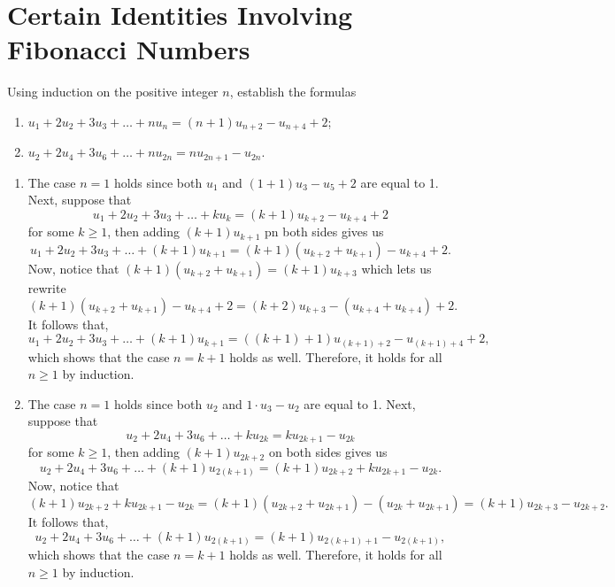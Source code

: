 \section{Certain Identities Involving Fibonacci Numbers}

\begin{exercise}
    Using induction on the positive integer $n$, establish the formulas
    \begin{enumerate}
        \item $u_1 + 2u_2 + 3u_3 + \dots + nu_n = (n+1)u_{n+2} - u_{n+4} + 2$;
        \item $u_2 + 2u_4 + 3u_6 + \dots + nu_{2n} = nu_{2n + 1} - u_{2n}$.\\
    \end{enumerate}
\end{exercise}

\begin{solution}
    \begin{enumerate}
        \item The case $n = 1$ holds since both $u_1$ and $(1+1)u_3 - u_5 + 2$ are equal to 1. Next, suppose that
        $$u_1 + 2u_2 + 3u_3 + \dots + ku_k = (k+1)u_{k+2} - u_{k+4} + 2$$
        for some $k \geq 1$, then adding $(k+1)u_{k+1}$ pn both sides gives us
        $$u_1 + 2u_2 + 3u_3 + \dots + (k+1)u_{k+1} = (k+1)(u_{k+2} + u_{k+1}) - u_{k+4} + 2.$$
        Now, notice that $(k+1)(u_{k+2} + u_{k+1}) = (k+1)u_{k+3}$ which lets us rewrite $$(k+1)(u_{k+2} + u_{k+1}) - u_{k+4} + 2 = (k+2)u_{k+3} - (u_{k+4} + u_{k+4}) + 2.$$
        It follows that,
        $$u_1 + 2u_2 + 3u_3 + \dots + (k+1)u_{k+1} = ((k+1) + 1)u_{(k+1)+2} - u_{(k+1) + 4} + 2,$$
        which shows that the case $n = k+1$ holds as well. Therefore, it holds for all $n \geq 1$ by induction.
        \item The case $n = 1$ holds since both $u_2$ and $1\cdot u_3 - u_2$ are equal to 1. Next, suppose that
        $$u_2 + 2u_4 + 3u_6 + \dots + ku_{2k} = ku_{2k + 1} - u_{2k}$$
        for some $k \geq 1$, then adding $(k+1)u_{2k+2}$ on both sides gives us
        $$u_2 + 2u_4 + 3u_6 + \dots + (k+1)u_{2(k+1)} = (k+1)u_{2k+2}+ ku_{2k + 1} - u_{2k}.$$
        Now, notice that 
        $$(k+1)u_{2k+2}+ ku_{2k + 1} - u_{2k} = (k+1)(u_{2k+2} + u_{2k+1}) - (u_{2k} + u_{2k + 1}) = (k+1)u_{2k + 3} - u_{2k + 2}.$$
        It follows that,
        $$u_2 + 2u_4 + 3u_6 + \dots + (k+1)u_{2(k+1)} = (k+1)u_{2(k+1) + 1} - u_{2(k+1)},$$
        which shows that the case $n = k+1$ holds as well. Therefore, it holds for all $n \geq 1$ by induction. \\
    \end{enumerate}
\end{solution}

